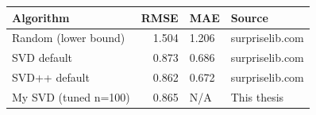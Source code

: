 \begin{tabular}{lrll}
\toprule
           Algorithm &  RMSE &    MAE &          Source \\
\midrule
Random (lower bound) & 1.504 &  1.206 & surpriselib.com \\
         SVD default & 0.873 &  0.686 & surpriselib.com \\
       SVD++ default & 0.862 &  0.672 & surpriselib.com \\
My SVD (tuned n=100) & 0.865 &    N/A &     This thesis \\
\bottomrule
\end{tabular}
